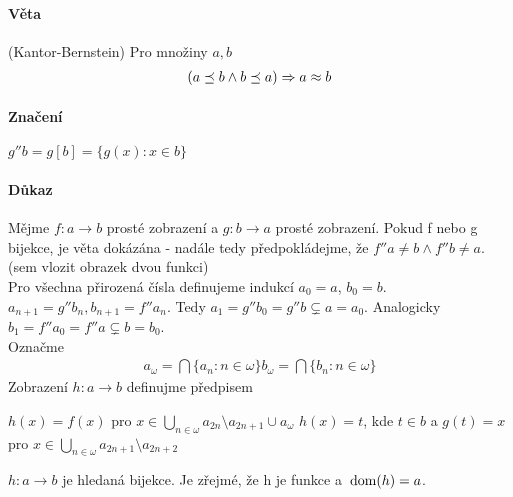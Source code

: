 \documentclass[a4paper,12pt,titlepage]{article}
\begin{document}
\paragraph{Věta}(Kantor-Bernstein) Pro množiny $a,b$
\begin{align}
	(a \preceq b \land b \preceq a) \Rightarrow a \approx b
\end{align}
\paragraph{Značení}
$g''b = g[b] = \{g(x) : x \in b\}$
\paragraph{Důkaz}
Mějme $f: a \to b$ prosté zobrazení a $g: b \to a$ prosté zobrazení. Pokud f
nebo g bijekce, je věta dokázána - nadále tedy předpokládejme, že $f''a \neq b
\land f''b \neq a$. \\
(sem vlozit obrazek dvou funkci)\\
Pro všechna přirozená čísla definujeme indukcí $a_0 = a$, $b_0 = b$. $a_{n+1} =
g''b_n, b_{n+1} = f''a_n$. Tedy $a_1 = g''b_0 = g''b \subsetneq a = a_0 $.
Analogicky $b_1 = f''a_0 = f''a \subsetneq b = b_0 $.\\
Označme 
\begin{align}
a_\omega = \bigcap\{a_n: n \in \omega\}
b_\omega = \bigcap\{b_n: n \in \omega\} 
\end{align}
Zobrazení $h: a \to b$ definujme předpisem 

$h(x) = f(x)$ pro $x \in
\bigcup_{n\in\omega} a_{2n} \setminus a_{2n+1} \cup a_\omega$ 
$h(x) = t$, kde $t \in b$ a $g(t) = x$ pro 
$x \in \bigcup_{n\in\omega} a_{2n+1} \setminus a_{2n+2}$

$h: a \to b$ je hledaná bijekce. Je zřejmé, že h je funkce a $\operatorname*{\,dom}(h) = a$.
\end{document}
